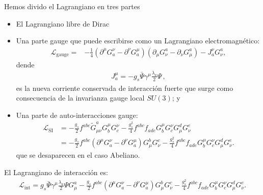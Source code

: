 \begin{frame}
Hemos divido el Lagrangiano en tres partes
\begin{itemize}
\item El Lagrangiano libre de Dirac
\item Una parte gauge que puede escribirse como un Lagrangiano electromagnético:
\begin{align}
  \mathcal{L}_{\text{gauge}}=&-\frac{1}{4}\left(\partial^\mu G^\nu_a-\partial^\nu G^\mu_a\right)\left(\partial_\mu G_\nu^a-\partial_\nu G_\mu^a\right)-J^\nu_aG_\nu^a,
\end{align}
dende
\begin{align}
  J^\mu_a=-g_s\bar{\Psi}\gamma^\mu\frac{\lambda_a}{2}\Psi\,,
\end{align}
es la nueva corriente conservada de interacción fuerte que surge como consecuencia de la invarianza gauge local $SU(3)$; y 
\item Una parte de auto-interacciones gauge:
  \begin{align}
    \mathcal{L}_{\text{SI}}  &=- \frac{g_s}{2}f^{a b c}\widetilde{G}_{\mu\nu}^aG_b^\mu G_c^\nu
    -\frac{g_s^2}{4}f^{a b c}f_{a d e}G_b^\mu G_c^\nu G^d_\mu G^e_\nu\nonumber\\
  &=-\frac{g_s}{2}f^{abc}\left(\partial^\mu G^\nu_a-\partial^\nu G^\mu_a\right)G^b_\mu G^c_\nu-\frac{g_s^2}{4}f^{abc}f_{ade}G^\mu_bG^\nu_cG^d_\mu G^e_\nu.
  \end{align}
que se desaparecen en el caso Abeliano.
\end{itemize}

El Lagrangiano de interacción es:
\begin{align}
  \mathcal{L}_{\text{int}}=g_s\bar{\Psi}\gamma^\mu\frac{\lambda_a}{2}\Psi G_\mu^a-\frac{g_s}{2}f^{abc}\left(\partial^\mu G^\nu_a-\partial^\nu G^\mu_a\right)G^b_\mu G^c_\nu-\frac{g_s^2}{4}f^{abc}f_{ade}G^\mu_bG^\nu_cG^d_\mu G^e_\nu.
\end{align}

\end{frame}

